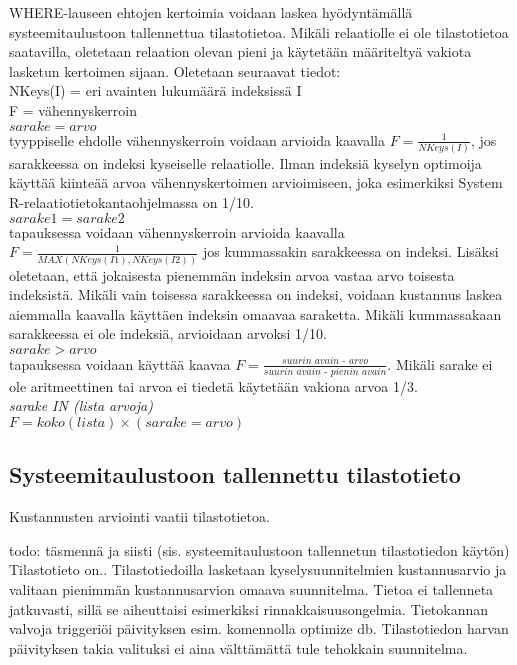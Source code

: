 \documentclass[finnish]{tktltiki2}
\theoremstyle{definition}
\theoremstyle{remark}
\begin{document}
WHERE-lauseen ehtojen kertoimia voidaan laskea hyödyntämällä systeemitaulustoon tallennettua tilastotietoa. Mikäli relaatiolle ei ole tilastotietoa saatavilla, oletetaan relaation olevan pieni ja käytetään määriteltyä vakiota lasketun kertoimen sijaan. \cite{selinger1979access} Oletetaan seuraavat tiedot: %
\\\newline
NKeys(I) = eri avainten lukumäärä indeksissä I
\\
F = vähennyskerroin
\\\newline
$sarake = arvo$ 
\\
tyyppiselle ehdolle vähennyskerroin voidaan arvioida kaavalla $F = \frac{1}{NKeys(I)}$, jos sarakkeessa on indeksi kyseiselle relaatiolle. \cite{selinger1979access} Ilman indeksiä kyselyn optimoija käyttää kiinteää arvoa vähennyskertoimen arvioimiseen, joka esimerkiksi System R-relaatiotietokantaohjelmassa on 1/10.
\\\newline
$sarake1 = sarake2$ 
\\
tapauksessa voidaan vähennyskerroin arvioida kaavalla $F = \frac{1}{MAX (NKeys(I1), NKeys(I2))}$ jos kummassakin sarakkeessa on indeksi. Lisäksi oletetaan, että jokaisesta pienemmän indeksin arvoa vastaa arvo toisesta indeksistä. Mikäli vain toisessa sarakkeessa on indeksi, 
voidaan kustannus laskea aiemmalla kaavalla käyttäen indeksin omaavaa saraketta. Mikäli kummassakaan sarakkeessa ei ole indeksiä, arvioidaan arvoksi 1/10.
\\\newline
$sarake > arvo$
\\
tapauksessa voidaan käyttää kaavaa $F = \frac{\textit{suurin avain - arvo}}{\textit{suurin avain - pienin avain}}$. Mikäli sarake ei ole aritmeettinen tai arvoa ei tiedetä käytetään vakiona arvoa 1/3.
\\\newline
\textit{sarake IN (lista arvoja)}
\\
$F = koko(lista) \times (sarake = arvo)$

\subsection{Systeemitaulustoon tallennettu tilastotieto}
Kustannusten arviointi vaatii tilastotietoa. \cite{ramakrishnan2003database}

todo: täsmennä ja siisti
(sis. systeemitaulustoon tallennetun tilastotiedon käytön)
Tilastotieto on..
Tilastotiedoilla lasketaan kyselysuunnitelmien kustannusarvio ja valitaan pienimmän kustannusarvion omaava suunnitelma.
Tietoa ei tallenneta jatkuvasti, sillä se aiheuttaisi esimerkiksi rinnakkaisuusongelmia. Tietokannan valvoja 
triggeriöi päivityksen esim. komennolla optimize db. Tilastotiedon harvan päivityksen takia valituksi ei aina välttämättä tule 
tehokkain suunnitelma.
\end{document}
